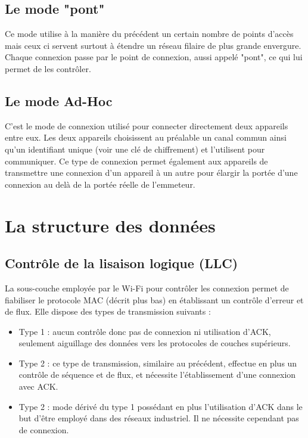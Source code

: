 \documentclass[12pt]{article}
\begin{document}
\subsection{Le mode "pont"}
Ce mode utilise à la manière du précédent un certain nombre de points d'accès mais ceux ci servent surtout à étendre un réseau filaire de plus grande envergure. Chaque connexion passe par le point de connexion, aussi appelé "pont", ce qui lui permet de les contrôler.

\subsection{Le mode Ad-Hoc}
C'est le mode de connexion utilisé pour connecter directement deux appareils entre eux. Les deux appareils choisissent au préalable un canal commun ainsi qu'un identifiant unique (voir une clé de chiffrement) et l'utilisent pour communiquer. Ce type de connexion permet également aux appareils de transmettre une connexion d'un appareil à un autre pour élargir la portée d'une connexion au delà de la portée réelle de l'emmeteur.

\newpage
\section{La structure des données}

\subsection{Contrôle de la lisaison logique (LLC)}
La sous-couche employée par le Wi-Fi pour contrôler les connexion permet de fiabiliser le protocole MAC (décrit plus bas) en établissant un contrôle d'erreur et de flux. Elle dispose des types de transmission suivants :

\begin{itemize}
	\item Type 1 : aucun contrôle donc pas de connexion ni utilisation d'ACK, seulement aiguillage des données  vers les protocoles de couches supérieurs.
	\item Type 2 : ce type de transmission, similaire au précédent, effectue en plus un contrôle de séquence et de flux, et nécessite l'établissement d'une connexion avec ACK.
	\item Type 2 : mode dérivé du type 1 possédant en plus l'utilisation d'ACK dans le but d'être employé dans des réseaux industriel. Il ne nécessite cependant pas de connexion.
\end{itemize}
\end{document}
